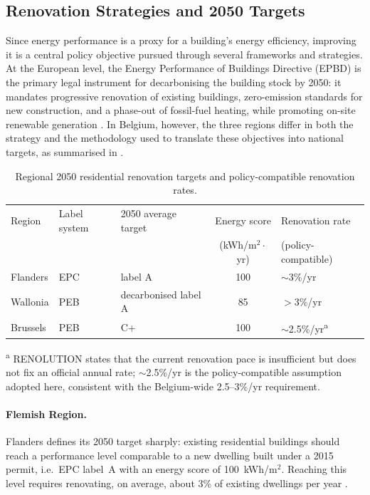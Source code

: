\subsection{Renovation Strategies and 2050 Targets}
Since energy performance is a proxy for a building's energy efficiency, improving
it is a central policy objective pursued through several frameworks and
strategies. At the European level, the Energy Performance of Buildings Directive
(EPBD) is the primary legal instrument for decarbonising the building stock by
2050: it mandates progressive renovation of existing buildings, zero-emission
standards for new construction, and a phase-out of fossil-fuel heating, while
promoting on-site renewable generation \cite{epbd_2024}. In Belgium, however, the
three regions differ in both the strategy and the methodology used to translate
these objectives into national targets, as summarised in
.

\begin{table}[ht]
  \centering
  \caption{Regional 2050 residential renovation targets and policy-compatible
           renovation rates.}
  \label{tab:regional_renovation_targets}
  \begin{tabular}{lllcl}
    \toprule
    Region & Label system & 2050 average target & Energy score & Renovation rate \\
           &              &                     & (kWh/m$^2\cdot$yr) & (policy-compatible) \\
    \midrule
    Flanders & EPC & label A                    & 100 & $\sim$3\%/yr \\
    Wallonia & PEB & decarbonised label A        & 85  & $>$3\%/yr \\
    Brussels & PEB & C+                          & 100 & $\sim$2.5\%/yr\textsuperscript{a} \\
    \bottomrule
  \end{tabular}

  \vspace{2pt}
  {\footnotesize \textsuperscript{a} RENOLUTION states that the current
   renovation pace is insufficient but does not fix an official annual rate;
   $\sim$2.5\%/yr is the policy-compatible assumption adopted here, consistent
   with the Belgium-wide 2.5--3\%/yr requirement.}
\end{table}

\paragraph{Flemish Region.} Flanders defines its 2050 target sharply: existing
residential buildings should reach a performance level comparable to a new
dwelling built under a 2015 permit, i.e.\ EPC label~A with an energy score of
100~kWh/m$^2$. Reaching this level requires renovating, on average, about 3\% of
existing dwellings per year \cite{veka_ltrs_2050}.

